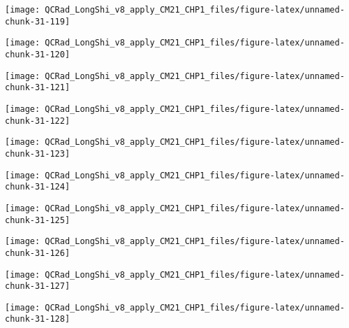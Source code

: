 \documentclass[
  10pt,
  a4paper,oneside]{article}
\begin{document}
\begin{center}\texttt{[image: QCRad\_LongShi\_v8\_apply\_CM21\_CHP1\_files/figure-latex/unnamed-chunk-31-119]} \end{center}

\begin{center}\texttt{[image: QCRad\_LongShi\_v8\_apply\_CM21\_CHP1\_files/figure-latex/unnamed-chunk-31-120]} \end{center}

\begin{center}\texttt{[image: QCRad\_LongShi\_v8\_apply\_CM21\_CHP1\_files/figure-latex/unnamed-chunk-31-121]} \end{center}

\begin{center}\texttt{[image: QCRad\_LongShi\_v8\_apply\_CM21\_CHP1\_files/figure-latex/unnamed-chunk-31-122]} \end{center}

\begin{center}\texttt{[image: QCRad\_LongShi\_v8\_apply\_CM21\_CHP1\_files/figure-latex/unnamed-chunk-31-123]} \end{center}

\begin{center}\texttt{[image: QCRad\_LongShi\_v8\_apply\_CM21\_CHP1\_files/figure-latex/unnamed-chunk-31-124]} \end{center}

\begin{center}\texttt{[image: QCRad\_LongShi\_v8\_apply\_CM21\_CHP1\_files/figure-latex/unnamed-chunk-31-125]} \end{center}

\begin{center}\texttt{[image: QCRad\_LongShi\_v8\_apply\_CM21\_CHP1\_files/figure-latex/unnamed-chunk-31-126]} \end{center}

\begin{center}\texttt{[image: QCRad\_LongShi\_v8\_apply\_CM21\_CHP1\_files/figure-latex/unnamed-chunk-31-127]} \end{center}

\begin{center}\texttt{[image: QCRad\_LongShi\_v8\_apply\_CM21\_CHP1\_files/figure-latex/unnamed-chunk-31-128]} \end{center}
\end{document}
